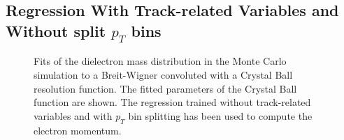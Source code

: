 \documentclass{cmspaper}
\begin{document}
\subsection{Regression With Track-related Variables and Without split $p_{T}$ bins }

\begin{figure}[h]
\centering
	\caption{Fits of the dielectron mass distribution in the Monte Carlo simulation to
        a Breit-Wigner convoluted with a Crystal Ball resolution function. The fitted parameters 
        of the Crystal Ball function are shown. The regression trained without track-related variables
        and with $p_{T}$ bin splitting has been used to compute the electron momentum.}
	\label{fig:ZMassFit_MC_Regression3}
\end{figure}
\end{document}
